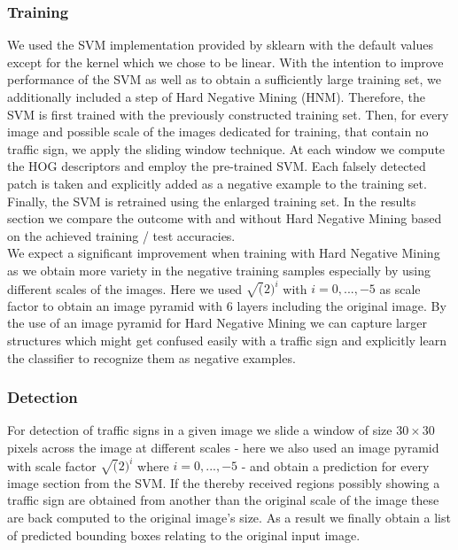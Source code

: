 \documentclass[12pt,a4paper,bibliography=totocnumbered,listof=totocnumbered]{scrartcl}
\begin{document}
\subsubsection{Training}
We used the SVM implementation provided by sklearn \cite{sklearnsvm} with the default values except for the kernel which we chose to be linear. With the intention to improve performance of the SVM as well as to obtain a sufficiently large training set, we additionally included a step of Hard Negative Mining (HNM). 
Therefore, the SVM is first trained with the previously constructed training set. Then, for every image and possible scale of the images dedicated for training, that contain no traffic sign, we apply the sliding window technique. At each window we compute the HOG descriptors and employ the pre-trained SVM. Each falsely detected patch is taken and explicitly added as a negative example to the training set. Finally, the SVM is retrained using the enlarged training set.
In the results section we compare the outcome with and without Hard Negative Mining based on the achieved training / test accuracies. \\
We expect a significant improvement when training with Hard Negative Mining as we obtain more variety in the negative training samples especially by using different scales of the images. Here we used $\sqrt(2)^i$ with $i = 0,...,-5$ as scale factor to obtain an image pyramid with $6$ layers including the original image. By the use of an image pyramid for Hard Negative Mining we can capture larger structures which might get confused easily with a traffic sign and explicitly learn the classifier to recognize them as negative examples.   

\subsubsection{Detection}
For detection of traffic signs in a given image we slide a window of size $30 \times 30$ pixels across the image at different scales - here we also used an image pyramid with  scale factor $\sqrt(2)^i$ where $i = 0,...,-5$ - and obtain a prediction for every image section from the SVM. If the thereby received regions possibly showing a traffic sign are obtained from another than the original scale of the image these are back computed to the original image's size. As a result we finally obtain a list of predicted bounding boxes relating to the original input image.
\end{document}
